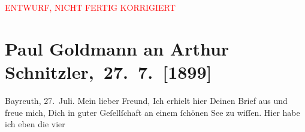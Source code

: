 
\begin{center}
            \textcolor{red}{ENTWURF, NICHT FERTIG KORRIGIERT}
                      \end{center}
            
         
         \newcommand{\erwaehntePersonen}{Personen: Richard Beer-Hofmann, Alfred Dreyfus, Fedor Mamroth, Richard Wagner, Cosima Wagner}
         \newcommand{\erwaehnteInstitutionen}{Institutionen: Bayreuther Festspiele}
         \newcommand{\erwaehnteOrte}{Orte: Bayreuth, Deutschland, Grönland, Italien, Rennes, Velden am Wörthersee, Villach, Wörthersee}
         \newcommand{\erwaehnteWerke}{Werke: Der Ring des Nibelungen}
               \section[ Paul Goldmann an Arthur Schnitzler, 27. 7. {[}1899{]}]{ Paul Goldmann an Arthur Schnitzler, 27. 7. {[}1899{]}}\nopagebreak{}\rehead{ }\begin{ledgroupsized}[t]{13cm}\normalsize\beginnumbering \toendnotes[C]{\smallbreak\pagebreak[2]} 
\toendnotes[C]{\smallbreak}\pstart
           \raggedleft{}{\pb}Bayreuth, 27. Juli.\pend
           \pstart\center{}Mein lieber Freund,\pend\pstart
           Ich erhielt hier Deinen Brief aus \label{K_L02881-1v}\label{K_L02881-1h} und freue mich, Dich in guter
               Geſellſchaft an einem ſchönen See zu wiſſen.\pend
           \pstart
           Hier habe ich eben die vier

\end{ledgroupsized}

